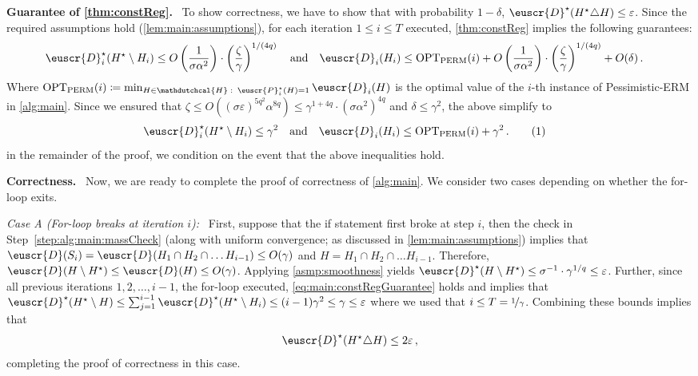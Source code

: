 \documentclass[11pt]{article}
\theoremstyle{plain}
\theoremstyle{definition}
\theoremstyle{remark}
\newcommand{\yesnum}{\addtocounter{equation}{1}\tag{\theequation}}
\newcommand{\quadtext}[1]{\quad\text{#1}\quad}
\newcommand{\quadand}{\quadtext{and}}
\newcommand{\inparen}[1]{\left(#1\right)}
\newcommand{\nfrac}[2]{\nicefrac{#1}{#2}}
\newcommand{\opt}{\ensuremath{\mathrm{OPT}}}
\newcommand{\eps}{\varepsilon}
\newcommand{\customcal}[1]{\euscr{#1}}
\newcommand{\cD}{\customcal{D}}
\newcommand{\cP}{\customcal{P}}
\renewcommand{\paragraph}[1]{\medskip \noindent\textbf{#1}~}
\newcommand{\itparagraph}[1]{\medskip \noindent\textit{#1}~}
\newcommand{\hypo}[1]{\mathdutchcal{#1}}
\newcommand{\hyH}{\hypo{H}}
\newcommand{\pERM}{Pessimistic-ERM}
\newcommand{\optset}{{H^\star}}
\newcommand{\cDtrue}{\cD^\star}
\newcommand{\cDgiven}{\cD}
\newcommand{\cPtrue}{\cP^\star}
\begin{document}
        \paragraph{Guarantee of \cref{thm:constReg}.}
        To show correctness, we have to show that with probability $1-\delta$, $\cDtrue(\optset\triangle H)\leq \eps$. 
        Since the required assumptions hold (\cref{lem:main:assumptions}), for each iteration $1\leq i\leq T$ executed, \cref{thm:constReg} implies the following guarantees:
        \begin{align*}
            \cDtrue_i(\optset\setminus H_i) 
                \leq O\inparen{\frac{1}{\sigma\alpha^2}}\cdot \inparen{\frac{\zeta}{\gamma}}^{1/(4q)}
                \quadand
            \cDgiven_i(H_i) 
                &\leq \opt_{\rm PERM}(i) + O\inparen{\frac{1}{\sigma\alpha^2}}\cdot \inparen{\frac{\zeta}{\gamma}}^{1/(4q)} + O(\delta)\,.
        \end{align*}
        Where $\opt_{\rm PERM}(i)\coloneqq \min_{H\in \hyH\,\colon\,\cPtrue_i(H)=1}\cDgiven_i(H)$ is the optimal value of the $i$-th instance of \pERM{} in \cref{alg:main}.
        Since we ensured that $\zeta\leq O((\sigma\eps)^{5q^2}\alpha^{8q})\leq  \gamma^{1+4q}\cdot (\sigma\alpha^2)^{4q}$ and $\delta\leq \gamma^2$, the above simplify to 
        \begin{align*}
            \cDtrue_i(\optset\setminus H_i) 
                \leq \gamma^2
                \quadand
            \cDgiven_i(H_i) 
                &\leq \opt_{\rm PERM}(i) + \gamma^2\,.
                \yesnum\label{eq:main:constRegGuarantee}
        \end{align*} 
        in the remainder of the proof, we condition on the event that the above inequalities hold. 

        \paragraph{Correctness.}
        Now, we are ready to complete the proof of correctness of \cref{alg:main}.
            We consider two cases depending on whether the for-loop exits.

            \itparagraph{Case A (For-loop breaks at iteration $i$):}
            First, suppose that the if statement first broke at step $i$, then the check in Step~\ref{step:alg:main:massCheck} (along with uniform convergence; as discussed in \cref{lem:main:assumptions}) implies that $\cD(S_i)=\cD(H_1\cap H_2\cap\dots H_{i-1})\leq O(\gamma)$ and $H=H_1\cap H_2\cap\dots H_{i-1}$.
            Therefore, $\cD(H\setminus \optset)\leq \cD(H)\leq O(\gamma)$. 
            Applying \cref{asmp:smoothness} yields $\cDtrue(H \setminus \optset) \leq \sigma^{-1}\cdot \gamma^{1/q}\leq \eps$.
            Further, since all previous iterations $1,2,\dots,i-1$, the for-loop executed, \cref{eq:main:constRegGuarantee} holds and implies that 
            $\cDtrue(\optset\setminus H)\leq \sum_{j=1}^{i-1} \cDtrue(\optset\setminus H_i)\leq (i-1)\gamma^2\leq \gamma\leq \eps$ where we used that $i\leq T=\nfrac{1}{\gamma}$.
            Combining these bounds implies that 
            \[
                \cDtrue(\optset\triangle H)\leq 2\eps\,,
            \]
            completing the proof of correctness in this case.
\end{document}
